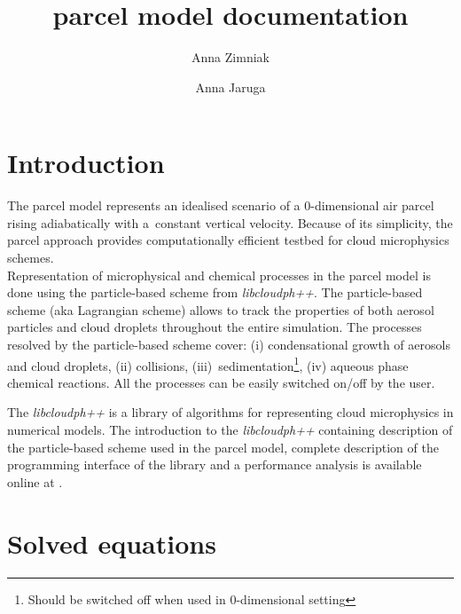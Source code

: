 \documentclass[11pt]{article}
\author[1]{Anna Zimniak}
\author[1]{Anna Jaruga}
\affil[1]{Institute of Geophysics, Faculty of Physics, University of Warsaw, Poland}
\title{parcel model documentation}
\begin{document}
\maketitle
\vspace{-4em}


\section{Introduction}\label{sec:intro}

The parcel model represents an idealised scenario of a 0-dimensional air parcel rising adiabatically with a~constant vertical velocity. 
Because of its simplicity, the parcel approach provides computationally efficient testbed for cloud microphysics schemes.\\

Representation of microphysical and chemical processes in the parcel model is done using the particle-based scheme from \emph{libcloudph++}.
The particle-based scheme (aka Lagrangian scheme) allows to track the properties of both 
  aerosol particles and cloud droplets throughout the entire simulation.
The processes resolved by the particle-based scheme cover:
  (i) condensational growth of aerosols and cloud droplets,
  (ii) collisions,
  (iii)~sedimentation\footnote{Should be switched off when used in 0-dimensional setting},
  (iv) aqueous phase chemical reactions.
All the processes can be easily switched on/off by the user.

The \emph{libcloudph++} is a library of algorithms for representing cloud microphysics in numerical models.
The introduction to the \emph{libcloudph++} containing description of the particle-based scheme used in the parcel model, 
  complete description of the programming interface of the library and a performance analysis
  is available online at \cite{Arabas_et_al_2015}.\\

\section{Solved equations}\label{sec:eqs}
\end{document}
